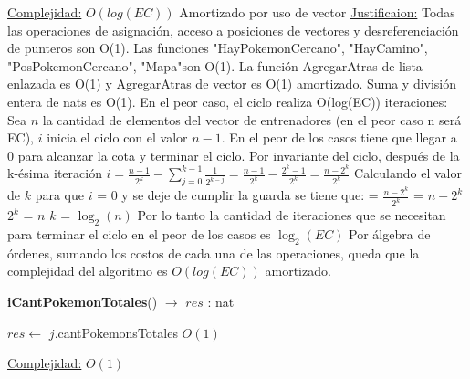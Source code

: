 \begin{Algoritmos}
\begin{algorithm}[H]
\begin{algorithmic}[1]
\medskip
\State \underline{Complejidad:} $O(log(EC))$ Amortizado por uso de vector
\State \underline{Justificaion:} Todas las operaciones de asignaci\'on, acceso a posiciones de vectores y desreferenciaci\'on de punteros son O(1). Las funciones "HayPokemonCercano", "HayCamino", "PosPokemonCercano", "Mapa"\hspace{0.5mm}son O(1). La funci\'on AgregarAtras de lista enlazada es O(1) y AgregarAtras de vector es O(1) amortizado. Suma y divisi\'on entera de nats es O(1).
En el peor caso, el ciclo realiza O(log(EC)) iteraciones: \newline
Sea $n$ la cantidad de elementos del vector de entrenadores (en el peor caso n ser\'a EC), $i$ inicia el ciclo con el valor $n-1$. En el peor de los casos tiene que llegar a 0 para alcanzar la cota y terminar el ciclo. 
Por invariante del ciclo, despu\'es de la k-\'esima iteraci\'on \newline
\newline
$i = \tfrac{n-1}{2^{k}} - \sum_{j=0}^{k-1}\tfrac{1}{2^{k-j}}= \tfrac{n-1}{2^{k}} - \tfrac{2^{k}-1}{2^{k}} = \tfrac{n-2^{k}}{2^{k}}$ \newline
\newline
Calculando el valor de $k$ para que $i$ = 0 y se deje de cumplir la guarda se tiene que:  = $\tfrac{n-2^{k}}{2^{k}}$  = $n-2^{k}$ \newline
$2^{k}$ = $n$ \newline
$k$ = $\log_{2}(n)$ \newline
Por lo tanto la cantidad de iteraciones que se necesitan para terminar el ciclo en el peor de los casos es $\log_{2}(EC)$ \newline
\newline
Por \'algebra de \'ordenes, sumando los costos de cada una de las operaciones, queda que la complejidad del algoritmo es $O(log(EC))$ amortizado.


\end{algorithmic}
\end{algorithm}



\begin{algorithm}[H]
{\textbf{iCantPokemonTotales}() $\to$ $res$ : nat}
\begin{algorithmic}[1]

\State $res \gets$ $j$.cantPokemonsTotales \Comment $O(1)$

\medskip
\State \underline{Complejidad:} $O(1)$


\end{algorithmic}
\end{algorithm}
\end{Algoritmos}
